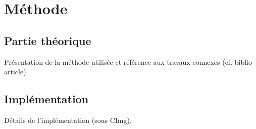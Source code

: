 \chapter{Méthode}
\section{Partie théorique}
Présentation de la méthode utilisée et référence aux travaux connexes (cf. biblio article).
\section{Implémentation}
Détails de l'implémentation (sous CImg).